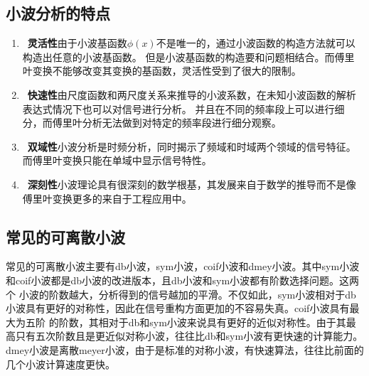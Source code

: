 \subsection{小波分析的特点}
\begin{enumerate}[1)]
	\item~\textbf{灵活性}\quad 由于小波基函数$\phi(x)$不是唯一的，通过小波函数的构造方法就可以构造出任意的小波基函数。
	但是小波基函数的构造要和问题相结合。而傅里叶变换不能够改变其变换的基函数，灵活性受到了很大的限制。
	\item~\textbf{快速性}\quad 由尺度函数和两尺度关系来推导的小波系数，在未知小波函数的解析表达式情况下也可以对信号进行分析。
	并且在不同的频率段上可以进行细分，而傅里叶分析无法做到对特定的频率段进行细分观察。
	\item~\textbf{双域性}\quad 小波分析是时频分析，同时揭示了频域和时域两个领域的信号特征。而傅里叶变换只能在单域中显示信号特性。
	\item~\textbf{深刻性}\quad 小波理论具有很深刻的数学根基，其发展来自于数学的推导而不是像傅里叶变换更多的来自于工程应用中。
\end{enumerate}
\subsection{常见的可离散小波}
常见的可离散小波主要有db小波，sym小波，coif小波和dmey小波。其中sym小波和coif小波都是db小波的改进版本，且db小波和sym小波都有阶数选择问题。这两个
小波的阶数越大，分析得到的信号越加的平滑。不仅如此，sym小波相对于db小波具有更好的对称性，因此在信号重构方面更加的不容易失真。coif小波具有最大为五阶
的阶数，其相对于db和sym小波来说具有更好的近似对称性。由于其最高只有五次阶数且是更近似对称小波，往往比db和sym小波有更快速的计算能力。
dmey小波是离散meyer小波，由于是标准的对称小波，有快速算法，往往比前面的几个小波计算速度更快。
